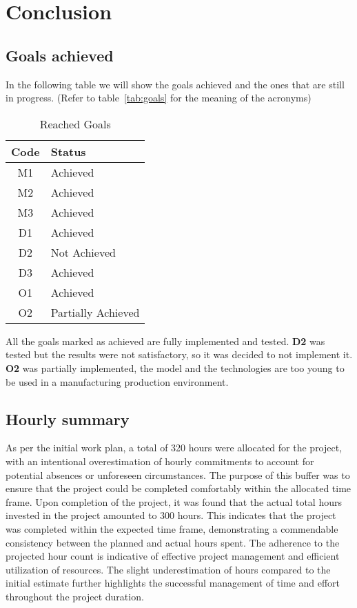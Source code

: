 \chapter{Conclusion}\label{cap:conclusions}
\section{Goals achieved}
In the following table we will show the goals achieved and the ones that are still in progress. (Refer to table~\ref{tab:goals} for the meaning of the acronyms)
\begin{table}[H]
    \caption{Reached Goals}\label{tab:reach-goals}
    \centering
    \begin{tabularx}{\textwidth}{|c|X|}
        \hline
        \textbf{Code} & \textbf{Status}\\
        \hline
        M1 & Achieved\\
        \hline
        M2 & Achieved\\
        \hline
        M3 & Achieved\\
        \hline
        D1 & Achieved\\
        \hline
        D2 & Not Achieved\\
        \hline
        D3 & Achieved\\
        \hline
        O1 & Achieved\\
        \hline
        O2 & Partially Achieved\\
        \hline
    \end{tabularx}
\end{table}
All the goals marked as achieved are fully implemented and tested.
\textbf{D2} was tested but the results were not satisfactory, so it was decided to not implement it.
\textbf{O2} was partially implemented, the model and the technologies are too young to be used in a manufacturing production environment.
\section{Hourly summary}
As per the initial work plan, a total of 320 hours were allocated for the project, with an intentional overestimation of hourly commitments to account for potential absences or unforeseen circumstances. 
The purpose of this buffer was to ensure that the project could be completed comfortably within the allocated time frame.
Upon completion of the project, it was found that the actual total hours invested in the project amounted to 300 hours. 
This indicates that the project was completed within the expected time frame, demonstrating a commendable consistency between the planned and actual hours spent.
The adherence to the projected hour count is indicative of effective project management and efficient utilization of resources. 
The slight underestimation of hours compared to the initial estimate further highlights the successful management of time and effort throughout the project duration.

